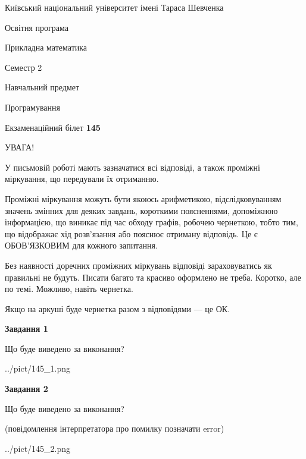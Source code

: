 \documentclass[12pt, ukrainian]{article}
\begin{document}
{{\begin {small}\par
{ \center  Київський національний університет імені Тараса Шевченка \par}
{\parbox {5 cm}{Освітня програма \hfill}{\parbox {7 cm}{Прикладна математика\hfill}}\parbox {6 cm}{\hfill Семестр 2}}\par
{\parbox {5 cm} {Навчальний предмет \hfill}\parbox {7 cm}{Програмування \hfill}\parbox {6cm}{\hfill}\par}\vspace{-7pt} \end{small}}{\center Екзаменаційний білет \No \textbf
{ 145 }\par}}
{
\begin {large}
УВАГА!

У письмовій роботі мають зазначатися всі відповіді, а також проміжні міркування, що передували їх отриманню.

Проміжні міркування можуть бути якоюсь арифметикою, відслідковуванням зна\-чень змінних для деяких завдань,
короткими поясненнями, допоміжною інформацією, що виникає під час обходу графів, робочею чернеткою,
тобто тим, що відображає хід розв’язання або пояснює отриману відповідь.
Це є ОБОВ’ЯЗКОВИМ для кожного запитання.

Без наявності доречних проміжних міркувань відповіді зараховуватись як правиль\-ні не будуть.
Писати багато та красиво оформлено не треба. Коротко, але по темі. Можли\-во, навіть чернетка.

Якщо на аркуші буде чернетка разом з відповідями --- це ОК.

\newpage

{\begin {center}\textbf{Завдання 1}\end {center}}\par
Що буде виведено за виконання?\par
\begin{center}
	{../pict/145_1.png}
\end{center}
\newpage

{\begin {center}\textbf{Завдання 2}\end {center}}\par
Що буде виведено за виконання?\par
 (повідомлення інтерпретатора про помилку позначати error)\par
\begin{center}
	{../pict/145_2.png}
\end{center}
\newpage


\end{large}}
\end{document}
